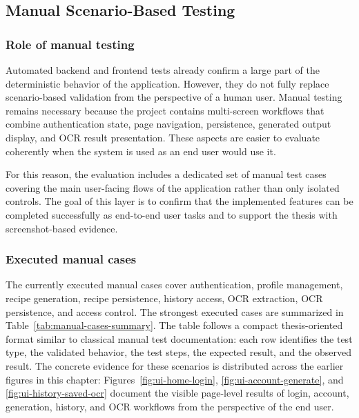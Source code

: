 \subsection{Manual Scenario-Based Testing}

\subsubsection{Role of manual testing}

Automated backend and frontend tests already confirm a large part of the
deterministic behavior of the application. However, they do not fully
replace scenario-based validation from the perspective of a human user.
Manual testing remains necessary because the project contains
multi-screen workflows that combine authentication state, page
navigation, persistence, generated output display, and OCR result
presentation. These aspects are easier to evaluate coherently when the
system is used as an end user would use it.

For this reason, the evaluation includes a dedicated set of manual test
cases covering the main user-facing flows of the application rather than
only isolated controls. The goal of this layer is to confirm that the
implemented features can be completed successfully as end-to-end user
tasks and to support the thesis with screenshot-based evidence.

\subsubsection{Executed manual cases}

The currently executed manual cases cover authentication, profile
management, recipe generation, recipe persistence, history access, OCR
extraction, OCR persistence, and access control. The strongest executed
cases are summarized in Table~\ref{tab:manual-cases-summary}. The table
follows a compact thesis-oriented format similar to classical manual
test documentation: each row identifies the test type, the validated
behavior, the test steps, the expected result, and the observed result.
The concrete evidence for these scenarios is distributed across the
earlier figures in this chapter: Figures~\ref{fig:ui-home-login},
\ref{fig:ui-account-generate}, and \ref{fig:ui-history-saved-ocr}
document the visible page-level results of login, account, generation,
history, and OCR workflows from the perspective of the end user.

